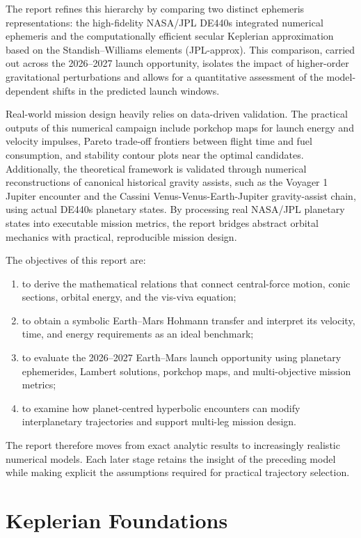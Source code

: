 \documentclass[11pt,a4paper]{article}
\begin{document}
The report refines this hierarchy by comparing two distinct ephemeris
representations: the high-fidelity NASA/JPL DE440s integrated numerical
ephemeris and the computationally efficient secular Keplerian approximation
based on the Standish--Williams elements (JPL-approx). This comparison,
carried out across the 2026--2027 launch opportunity, isolates the impact of
higher-order gravitational perturbations and allows for a quantitative
assessment of the model-dependent shifts in the predicted launch windows.

Real-world mission design heavily relies on data-driven validation. The
practical outputs of this numerical campaign include porkchop maps for launch
energy and velocity impulses, Pareto trade-off frontiers between flight time
and fuel consumption, and stability contour plots near the optimal candidates.
Additionally, the theoretical framework is validated through numerical
reconstructions of canonical historical gravity assists, such as the Voyager 1
Jupiter encounter and the Cassini Venus-Venus-Earth-Jupiter gravity-assist
chain, using actual DE440s planetary states. By processing real NASA/JPL
planetary states into executable mission metrics, the report bridges abstract
orbital mechanics with practical, reproducible mission design.

The objectives of this report are:
\begin{enumerate}
  \item to derive the mathematical relations that connect central-force motion,
        conic sections, orbital energy, and the vis-viva equation;
  \item to obtain a symbolic Earth--Mars Hohmann transfer and interpret its
        velocity, time, and energy requirements as an ideal benchmark;
  \item to evaluate the 2026--2027 Earth--Mars launch opportunity using
        planetary ephemerides, Lambert solutions, porkchop maps, and
        multi-objective mission metrics;
  \item to examine how planet-centred hyperbolic encounters can modify
        interplanetary trajectories and support multi-leg mission design.
\end{enumerate}

The report therefore moves from exact analytic results to increasingly realistic
numerical models. Each later stage retains the insight of the preceding model
while making explicit the assumptions required for practical trajectory
selection.

\section{Keplerian Foundations}
\label{sec:keplerian-foundations}
\end{document}
